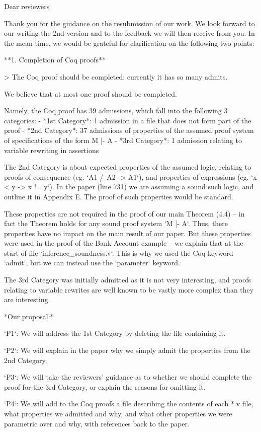 Dear reviewers 

Thank you for the guidance on the resubmission of our work. We look forward to our
writing the 2nd version and  to the feedback we will then receive from you. 
In the mean time, we would be grateful for clarification on the following two points:

**1. Completion of Coq proofs**

> The Coq proof should be completed: currently it has so many admits.

We believe that at most one proof should be completed. 

Namely, the Coq proof has 39  admissions, which fall into the following 
3 categories:
 - *1st Category*: 1 admission in a file that does not form part of the proof 
- *2nd Category*: 37 admissions of properties of the assumed proof system 
    of specifications of the form M |- A
- *3rd Category*: 1 admission relating to variable rewriting in assertions

The 2nd Category is about expected properties of the assumed logic, relating to 
proofs of consequence  (eg. `A1 /\ A2 -> A1`), and properties of expressions 
(eg. `x < y -> x != y`). In the paper (line 731) we are assuming a sound such logic,
and outline it in Appendix E. The proof of such properties would be standard.

These properties are not required in the proof  of our main Theorem (4.4) --
in fact the Theorem holds for any sound proof system   `M |- A`. Thus, there
properties  have no impact on the main result of our paper.
But these properties were used in the proof of the Bank Account example --
we explain that at the start of file `inference_soundness.v`. This is why we used
the Coq keyword `admit`,  but we can instead use the `parameter` keyword.   

The 3rd Category was initially admitted as it is not very interesting, and proofs 
relating to variable rewrites are well known to be vastly more complex than they 
are interesting. 

*Our proposal:*

`P1`:  We will address the 1st Category  by deleting the file containing it.

`P2`:  We will explain in the paper why we simply admit the properties from
 the 2nd Category.

`P3`: We will take the reviewers' guidance as to whether we should complete
the proof for the 3rd Category, or explain the reasons for omitting it.

`P4`: We will add to the Coq proofs a file describing the contents of each *.v file, 
 what properties we admitted and why, and what other properties we were
parametric over and why, with references back to the paper.

